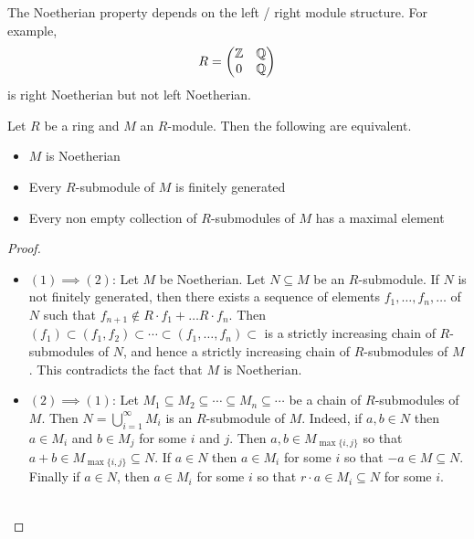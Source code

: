 \documentclass[a4paper]{article}
\begin{document}
The Noetherian property depends on the left / right module structure. For example, $$R=\begin{pmatrix}
\mathbb{Z} & \mathbb{Q}\\
0 & \mathbb{Q}
\end{pmatrix}$$ is right Noetherian but not left Noetherian. 

\begin{prp}{}{} Let $R$ be a ring and $M$ an $R$-module. Then the following are equivalent. 
\begin{itemize}
\item $M$ is Noetherian
\item Every $R$-submodule of $M$ is finitely generated
\item Every non empty collection of $R$-submodules of $M$ has a maximal element
\end{itemize} 
\begin{proof}~\\
\begin{itemize}
\item $(1)\implies(2)$: Let $M$ be Noetherian. Let $N\subseteq M$ be an $R$-submodule. If $N$ is not finitely generated, then there exists a sequence of elements $f_1,\dots,f_n,\dots$ of $N$ such that $f_{n+1}\notin R\cdot f_1+\dots R\cdot f_n$. Then $(f_1)\subset (f_1,f_2)\subset\cdots\subset(f_1,\dots,f_n)\subset$ is a strictly increasing chain of $R$-submodules of $N$, and hence a strictly increasing chain of $R$-submodules of $M$. This contradicts the fact that $M$ is Noetherian. 
\item $(2)\implies(1)$: Let $M_1\subseteq M_2\subseteq\cdots\subseteq M_n\subseteq\cdots$ be a chain of $R$-submodules of $M$. Then $N=\bigcup_{i=1}^\infty M_i$ is an $R$-submodule of $M$. Indeed, if $a,b\in N$ then $a\in M_i$ and $b\in M_j$ for some $i$ and $j$. Then $a,b\in M_{\max\{i,j\}}$ so that $a+b\in M_{\max\{i,j\}}\subseteq N$. If $a\in N$ then $a\in M_i$ for some $i$ so that $-a\in M\subseteq N$. Finally if $a\in N$, then $a\in M_i$ for some $i$ so that $r\cdot a\in M_i\subseteq N$ for some $i$. \\~\\


\end{itemize}
\end{proof}
\end{prp}
\end{document}
